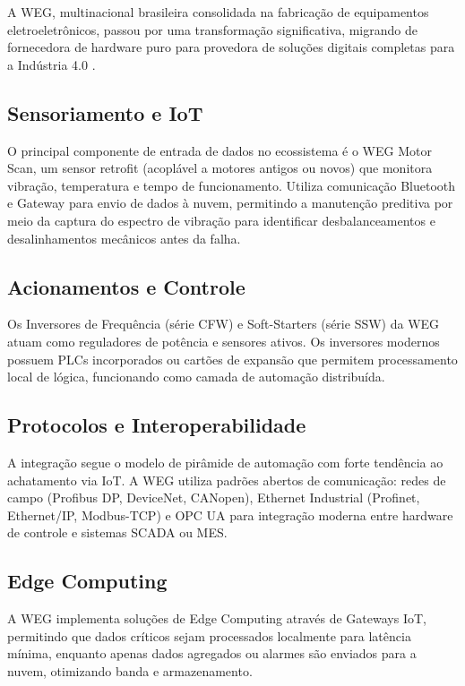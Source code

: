 \documentclass[12pt,a4paper,oneside]{article}
\begin{document}
A WEG, multinacional brasileira consolidada na fabricação de equipamentos eletroeletrônicos, passou por uma transformação significativa, migrando de fornecedora de hardware puro para provedora de soluções digitais completas para a Indústria 4.0 \cite{schwab2016}.

\subsection{Sensoriamento e IoT}

O principal componente de entrada de dados no ecossistema é o WEG Motor Scan, um sensor retrofit (acoplável a motores antigos ou novos) que monitora vibração, temperatura e tempo de funcionamento. Utiliza comunicação Bluetooth e Gateway para envio de dados à nuvem, permitindo a manutenção preditiva por meio da captura do espectro de vibração para identificar desbalanceamentos e desalinhamentos mecânicos antes da falha.

\subsection{Acionamentos e Controle}

Os Inversores de Frequência (série CFW) e Soft-Starters (série SSW) da WEG atuam como reguladores de potência e sensores ativos. Os inversores modernos possuem PLCs incorporados ou cartões de expansão que permitem processamento local de lógica, funcionando como camada de automação distribuída.

\subsection{Protocolos e Interoperabilidade}

A integração segue o modelo de pirâmide de automação com forte tendência ao achatamento via IoT. A WEG utiliza padrões abertos de comunicação: redes de campo (Profibus DP, DeviceNet, CANopen), Ethernet Industrial (Profinet, Ethernet/IP, Modbus-TCP) e OPC UA para integração moderna entre hardware de controle e sistemas SCADA ou MES.

\subsection{Edge Computing}

A WEG implementa soluções de Edge Computing através de Gateways IoT, permitindo que dados críticos sejam processados localmente para latência mínima, enquanto apenas dados agregados ou alarmes são enviados para a nuvem, otimizando banda e armazenamento.
\end{document}
